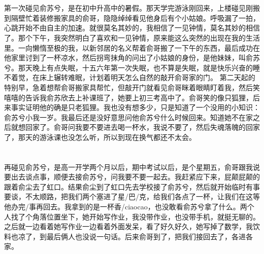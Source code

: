 \chapter{}
第一次碰见俞苏兮，是在初中升高中的暑假。那天学完游泳刚回来，上楼碰见刚搬到隔壁忙着装修搬家具的俞哥，隐隐绰绰看见他身后有个小姑娘。呼吸漏了一拍，心跳开始不由自主的加速。就很莫名其妙的，我相信了一见钟情，莫名其妙的相信了。那个下午，我突然明白了喜欢和一见钟情，原来能这么突然的出现在我的生活里。一向懒惰至极的我，以新邻居的名义帮着俞哥搬了一下午的东西，最后成功在他家里讨到了一杯凉水，然后拐弯抹角的问出了小姑娘的身份，是他妹妹，叫俞苏兮。那天晚上有点失眠，十五六年第一次失眠，也不算是失眠，就是快乐兴奋的睡不着觉，在床上辗转难眠，计划着明天怎么自然的敲开俞哥家的门。
第二天起的特别早，急着想帮俞哥搬家具帮忙，但敲开门就看见俞哥眯着眼睛盯着我，然后笑嘻嘻的告诉我俞苏欣去上补课班了，她要上初三考高中了。俞哥笑的像只狐狸，后来事实证明他的确是只老狐狸。我也没有想多少，只是知道了一个没用的小知识：俞苏兮小我一岁。我最后还是没好意思问他俞苏兮什么时候回来。知道她不在家之后就想回家了。俞哥问我要不要进去喝一杯水，我说不要了，然后失魂落魄的回家了，那天的游泳课也没怎么听，所以到现在换气都还不太会。

\chapter{}
再碰见俞苏兮，是高一开学两个月以后，期中考试以后，是个星期五，俞哥跟我说要出去谈点事，顺便去接俞苏兮，问我要不要一起去。我赶紧应下来，屁颠屁颠的跟着俞尘去了虹口。结果俞尘到了虹口先去学校接了俞苏兮，然后就开始临时有事要谈，不太顺路，把我们两个塞进了星/巴/克，给我们各点了一杯，让我们在这等他办完/事再回去。我拿到的是一杯香/ciaocao，也没敢看俞苏兮拿了什么。两个人找了个角落位置坐下，她开始写作业，我没带作业，也没带手机，就挺无聊的。之后就一边看着她写作业一边看着外面发呆，看了好久好久，她写掉了数学，我饮料也凉了，到最后俩人也没说一句话。后来俞哥到了，把我们接回去了，各进各家。

